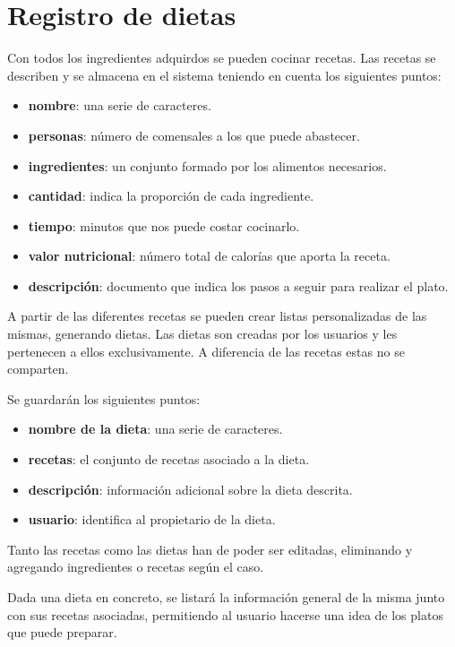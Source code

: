 \documentclass[a4paper,12pt]{report}
\begin{document}
\section{Registro de dietas}
\label{sec-1-2}
Con todos los ingredientes adquirdos se pueden cocinar recetas. Las
recetas se describen y se almacena en el sistema teniendo en cuenta
los siguientes puntos:
\begin{itemize}
\item \textbf{nombre}: una serie de caracteres.
\item \textbf{personas}: número de comensales a los que puede abastecer.
\item \textbf{ingredientes}: un conjunto formado por los alimentos necesarios.
\item \textbf{cantidad}: indica la proporción de cada ingrediente.
\item \textbf{tiempo}: minutos que nos puede costar cocinarlo.
\item \textbf{valor nutricional}: número total de calorías que aporta la
receta.
\item \textbf{descripción}: documento que indica los pasos a seguir para
realizar el plato.
\end{itemize}

\vspace{0.2cm}
A partir de las diferentes recetas se pueden crear listas
personalizadas de las mismas, generando dietas. Las dietas son
creadas por los usuarios y les pertenecen a ellos exclusivamente. A
diferencia de las recetas estas no se comparten.

Se guardarán los siguientes puntos:
\begin{itemize}
\item \textbf{nombre de la dieta}: una serie de caracteres.
\item \textbf{recetas}: el conjunto de recetas asociado a la dieta.
\item \textbf{descripción}: información adicional sobre la dieta descrita.
\item \textbf{usuario}: identifica al propietario de la dieta.
\end{itemize}

\vspace{0.2cm}
Tanto las recetas como las dietas han de poder ser editadas,
eliminando y agregando ingredientes o recetas según el caso.

Dada una dieta en concreto, se listará la información general de la
misma junto con sus recetas asociadas, permitiendo al usuario
hacerse una idea de los platos que puede preparar.
\end{document}
